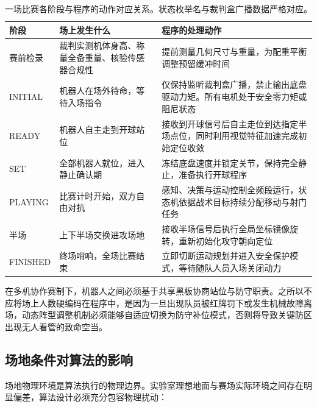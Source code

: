 \begin{table}[H]
\centering
\small
\begin{tabularx}{\textwidth}{p{2.4cm} X X}
\toprule
\textbf{阶段} & \textbf{场上发生什么} & \textbf{程序的处理动作} \\
\midrule
赛前检录 & 裁判实测机体身高、称量全备重量、核验传感器合规性 & 提前测量几何尺寸与重量，为配重平衡调整预留缓冲时间 \\
\addlinespace
INITIAL & 机器人在场外待命，等待入场指令 & 仅保持监听裁判盒广播，禁止输出底盘驱动力矩。所有电机处于安全零力矩或阻尼状态 \\
\addlinespace
READY & 机器人自主走到开球站位 & 接收到开球信号后自主走位到达指定半场点位，同时利用视觉特征加速完成初始定位收敛 \\
\addlinespace
SET & 全部机器人就位，进入静止确认期 & 冻结底盘速度并锁定关节，保持完全静止，准备执行开球程序 \\
\addlinespace
PLAYING & 比赛计时开始，双方自由对抗 & 感知、决策与运动控制全频段运行，状态机依据战术目标持续分配移动与射门任务 \\
\addlinespace
半场 & 上下半场交换进攻场地 & 接收半场信号后执行全局坐标镜像旋转，重新初始化攻守朝向定位 \\
\addlinespace
FINISHED & 终场哨响，全场比赛结束 & 立即切断运动规划并进入安全保护模式，等待随队人员入场关闭动力 \\
\bottomrule
\end{tabularx}
\caption{一场比赛各阶段与程序的动作对应关系。状态枚举名与裁判盒广播数据严格对应。}
\end{table}

在多机协作赛制下，机器人之间必须基于共享黑板协商站位与防守职责。之所以不应将场上人数硬编码在程序中，是因为一旦出现队员被红牌罚下或发生机械故障离场，动态阵型调整机制必须能够自适应切换为防守补位模式，否则将导致关键防区出现无人看管的致命空当。\official

\subsection{场地条件对算法的影响}

场地物理环境是算法执行的物理边界。实验室理想地面与赛场实际环境之间存在明显偏差，算法设计必须充分包容物理扰动：

